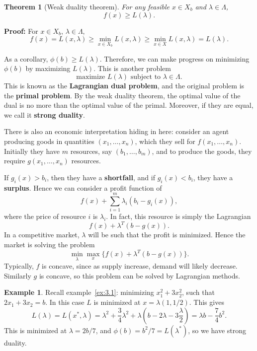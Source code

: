 \documentclass[12pt]{article}
\newtheorem{theorem}{Theorem}[section]
\theoremstyle{definition}
\newtheorem{example}{Example}[section]
\theoremstyle{remark}
\begin{document}
\begin{theorem}[Weak duality theorem]
	For any feasible $x \in X_b$ and $\lambda \in \Lambda$,
	\[
		f(x) \geq L(\lambda)
	.\] 
\end{theorem}

\begin{adjustbox}{minipage = \columnwidth - 25.5pt, margin=1em, frame=1pt, margin=0em}
\textbf{Proof:} For $x \in X_b$, $\lambda \in \Lambda$,
\[
	f(x) = L(x, \lambda) \geq \min_{x \in X_b}L(x, \lambda) \geq \min_{x \in X}L(x, \lambda) = L(\lambda)
.\]
\end{adjustbox}

As a corollary, $\phi(b) \geq L(\lambda)$. Therefore, we can make progress on minimizing $\phi(b)$ by maximizing $L(\lambda)$. This is another problem
\[
	\text{maximize }  L(\lambda) \text{ subject to } \lambda \in \Lambda \tag{D}\label{dproblem}
.\] 
This is known as the \textbf{Lagrangian dual problem}, and the original problem is the \textbf{primal problem}. By the weak duality theorem, the optimal value of the dual is no more than the optimal value of the primal. Moreover, if they are equal, we call it \textbf{strong duality}.

There is also an economic interpretation hiding in here: consider an agent producing goods in quantities $(x_1, \ldots, x_n)$, which they sell for $f(x_1, \ldots, x_n)$. Initially they have $m$ resources, say $(b_1, \ldots, b_m)$, and to produce the goods, they require $g(x_1, \ldots, x_n)$ resources.

If $g_i(x) > b_i$, then they have a \textbf{shortfall}, and if $g_i(x) < b_i$, they have a \textbf{surplus}. Hence we can consider a profit function of
\[
	f(x) + \sum_{i = 1}^{m} \lambda_i (b_i - g_i(x))
,\]
where the price of resource $i$ is $\lambda_i$. In fact, this resource is simply the Lagrangian
\[
	f(x) + \lambda^{T}(b - g(x))
.\]
In a competitive market, $\lambda$ will be such that the profit is minimized. Hence the market is solving the problem
\[
	\min_{\lambda} \max_{x} \{ f(x) + \lambda^{T}(b - g(x))\}
.\]
Typically, $f$ is concave, since as supply increase, demand will likely decrease. Similarly $g$ is concave, so this problem can be solved by Lagrangian methods.

\begin{adjustbox}{minipage = \columnwidth - 25.5pt, margin=1em, frame=1pt, margin=0em}
\begin{example}
	Recall example~\eqref{ex:3.1}: minimizing $x_1^2 + 3x_2^2$, such that $2x_1 + 3x_2 = b$. In this case $L$ is minimized at $x = \lambda(1, 1/2)$. This gives
	\[
		L(\lambda) = L(x^{\ast}, \lambda) = \lambda^2 + \frac{3}{4} \lambda^2 + \lambda \left( b - 2\lambda - 3 \frac{\lambda}{2} \right) = \lambda b - \frac{7}{4} b^2
	.\]
	This is minimized at $\lambda = 2b/7$, and $\phi(b) = b^2/7 = L(\lambda^{\ast})$, so we have strong duality.
\end{example}

\end{adjustbox}
\end{document}
